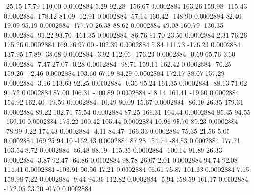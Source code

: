       -25.15       17.79      110.00     0.0002884
        5.29       92.28     -156.67     0.0002884
      163.26      159.98     -115.43     0.0002884
     -178.12       81.09      -12.91     0.0002884
      -57.14      160.42     -148.90     0.0002884
       82.40       19.09       95.19     0.0002884
     -177.70       26.38       88.62     0.0002884
       49.08      160.79     -130.35     0.0002884
      -91.22       93.70     -161.35     0.0002884
      -86.76       91.70       23.56     0.0002884
        2.31       76.26      175.26     0.0002884
      169.76       97.00     -102.39     0.0002884
        5.84      111.73     -176.23     0.0002884
      137.95       17.89      -38.68     0.0002884
       -3.92      112.06     -176.23     0.0002884
       -0.69       65.76        3.60     0.0002884
       -7.47       27.07       -0.28     0.0002884
      -98.71      159.11      162.42     0.0002884
      -76.25      159.26      -72.46     0.0002884
      103.60       67.19       84.29     0.0002884
      172.17       88.07      157.29     0.0002884
       -3.16      113.63       92.25     0.0002884
       -0.36       95.24      161.35     0.0002884
      -88.13       71.02       91.72     0.0002884
       87.00      106.31     -100.89     0.0002884
      -18.14      161.41      -19.50     0.0002884
      154.92      162.40      -19.59     0.0002884
      -10.49       80.09       15.67     0.0002884
      -86.10       26.35      179.31     0.0002884
       89.22      102.71       75.54     0.0002884
       87.25      169.31      164.44     0.0002884
       85.45       94.55     -159.10     0.0002884
      175.22      100.42      105.44     0.0002884
       10.96       95.70       89.23     0.0002884
      -78.99        9.22      174.43     0.0002884
       -4.11       84.47     -166.33     0.0002884
       75.35       21.56        5.05     0.0002884
      169.25       94.10     -162.43     0.0002884
       87.28      154.74      -84.83     0.0002884
      177.71      103.54        8.72     0.0002884
      -86.48       88.19     -115.35     0.0002884
     -100.14       91.89       26.33     0.0002884
       -3.87       92.47      -64.86     0.0002884
       98.78       26.07        2.01     0.0002884
       94.74       92.08      114.41     0.0002884
     -103.91       90.96       17.21     0.0002884
       96.61       75.87      101.33     0.0002884
        7.15      158.98        7.22     0.0002884
       -9.44       94.30      112.82     0.0002884
       -5.94      158.59      161.17     0.0002884
     -172.05       23.20       -0.70     0.0002884

